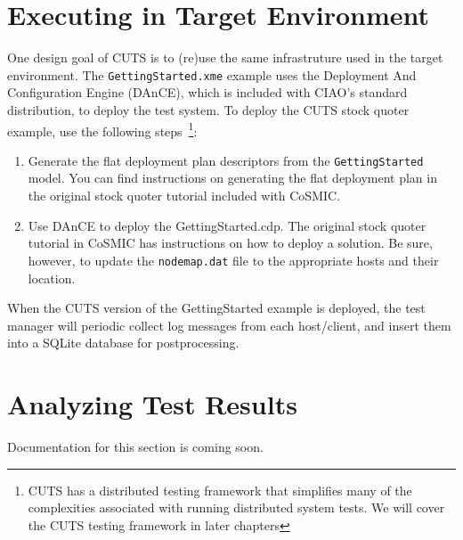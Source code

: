 \section{Executing in Target Environment}
\label{sec:quickstart-execution}

One design goal of CUTS is to (re)use the same infrastruture used in the 
target environment. The \texttt{GettingStarted.xme} example uses the Deployment 
And Configuration Engine (DAnCE), which is included with CIAO's standard 
distribution, to deploy the test system. To deploy the CUTS stock quoter 
example, use the following steps~\footnote{CUTS has a distributed testing
framework that simplifies many of the complexities associated with running
distributed system tests. We will cover the CUTS testing framework in later
chapters}:
\begin{enumerate}
  \item Generate the flat deployment plan descriptors from the 
  \texttt{GettingStarted}  model. You can find instructions on generating 
  the flat deployment plan in the original stock quoter tutorial included 
  with CoSMIC.
  
  \item Use DAnCE to deploy the GettingStarted.cdp. The original stock 
  quoter tutorial in CoSMIC has instructions on how to deploy a solution. 
  Be sure, however, to update the \texttt{nodemap.dat} file to the appropriate
  hosts and their location.
\end{enumerate}
When the CUTS version of the GettingStarted example is deployed, the test
manager will periodic collect log messages from each host/\-client, and 
insert them into a SQLite database for postprocessing.

\section{Analyzing Test Results}
\label{sec:quickstart-analysis}

Documentation for this section is coming soon.


